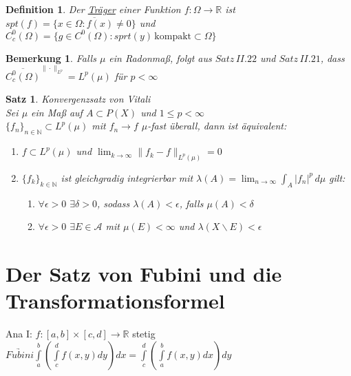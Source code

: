 \documentclass[11pt]{memoir}
\theoremstyle{changebreak}
\newtheorem{Definition}{Definition}[chapter]
\newtheorem{Bemerkung}{Bemerkung}[chapter]
\newtheorem{Satz}{Satz}[chapter]
\begin{document}
\begin{Definition}
Der \underline{Träger} einer Funktion $f: \Omega \rightarrow \mathbb R$ ist $spt(f) = \overline{\{x \in \Omega: f(x) \ne 0\}} $
und $C_c^0 (\Omega) = \{g \in C^0(\Omega): sprt(y) \, \text{kompakt} \subset \Omega\}$
\end{Definition}


\begin{Bemerkung}
Falls $\mu$ ein Radonmaß, folgt aus $Satz \, II.22$ und $Satz \,  II.21$, dass $\overline{C^0_c (\Omega)}^{\|\cdotp\|_{L^p}} = L^p (\mu)$ für $p < \infty$
\end{Bemerkung}

\begin{Satz}
\emph{Konvergenzsatz von Vitali} \\
Sei $\mu$ ein Maß auf $A \subset P(X)$ und $1 \leq p < \infty$ \\
$\{f_n\}_{n \in \mathbb N} \subset L^p(\mu)$ mit $f_n \rightarrow f$ $\mu$-fast überall, dann ist äquivalent:
\begin{enumerate}
	\item $f \subset L^p(\mu)$ und $\lim_{k \rightarrow \infty} \|f_k -f \|_{L^p (\mu)} = 0$
	\item $\{f_k\}_{k \in \mathbb N}$ ist gleichgradig integrierbar mit $\lambda(A) = \lim_{n \rightarrow \infty} \int_A |f_n|^p \, d\mu$ gilt:
	\begin{enumerate}
		\item $\forall \epsilon > 0$ $\exists \delta > 0$, sodass $\lambda(A) < \epsilon$, falls $\mu(A) < \delta$
		\item $\forall \epsilon > 0$ $\exists E \in \mathscr A$ mit $\mu(E) < \infty$ und $\lambda(X \backslash E) < \epsilon$
	\end{enumerate}
\end{enumerate}

\end{Satz}



\newpage
\chapter{Der Satz von Fubini und die Transformationsformel}
Ana I: $f: [a, b] \times [c, d] \rightarrow \mathbb R$ stetig \\
$\underrightarrow{Fubini} \int\limits_a^b \left( \int\limits_c^d f(x, y) dy\right) dx = \int\limits_c^d \left( \int\limits_a^b f(x, y) dx \right) dy$
\end{document}
